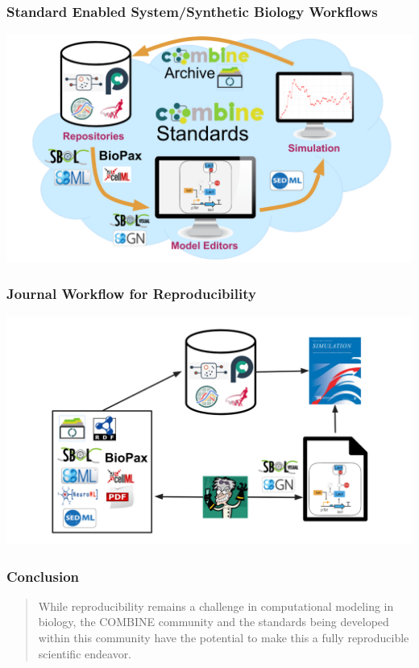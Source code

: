 \documentclass{beamer}
\begin{document}

\begin{frame}\frametitle{Standard Enabled System/Synthetic Biology Workflows}
\begin{center}
\includegraphics[width=\textwidth]{figs/COMBINE_workflow2}
\end{center}
\end{frame}

\begin{frame}\frametitle{Journal Workflow for Reproducibility}
\begin{center}
\includegraphics[width=\textwidth]{figs/JournalFlow}
\end{center}
\end{frame}

\begin{frame}\frametitle{Conclusion}
\begin{quotation}
While reproducibility remains a challenge in computational modeling in biology, the COMBINE community and the standards being developed within this community have the potential to make this a fully reproducible scientific endeavor.
\end{quotation}
\end{frame}
\end{document}
